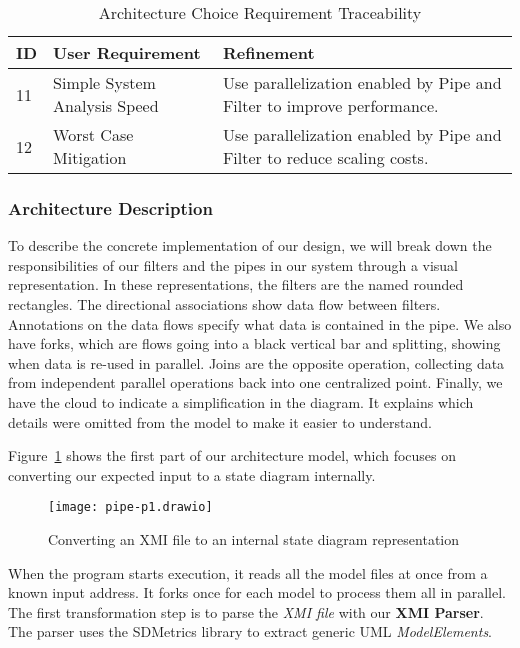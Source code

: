 \begin{table}[htbp]
    \centering
    \caption{Architecture Choice Requirement Traceability}\label{tab:arch-choice-table}
    \begin{tabularx}{\textwidth}{| l | l | X |}
        \hline
        \textbf{ID} & \textbf{User Requirement} & \textbf{Refinement} \\
        \hline
        11 & Simple System Analysis Speed & Use parallelization enabled by Pipe and Filter to improve performance. \\ \hline
        12 & Worst Case Mitigation & Use parallelization enabled by Pipe and Filter to reduce scaling costs.  \\ \hline
    \end{tabularx}
\end{table}

\newpage
\subsubsection{Architecture Description}\label{subsubsec:arch-desc}
To describe the concrete implementation of our design,
we will break down the responsibilities of our filters and the pipes in our system through a visual representation.
In these representations, the filters are the named rounded rectangles.
The directional associations show data flow between filters.
Annotations on the data flows specify what data is contained in the pipe.
We also have forks, which are flows going into a black vertical bar and splitting, showing when data is re-used in parallel.
Joins are the opposite operation, collecting data from independent parallel operations back into one centralized point.
Finally, we have the cloud to indicate a simplification in the diagram.
It explains which details were omitted from the model to make it easier to understand.

Figure~\ref{fig:pipe-1} shows the first part of our architecture model, which focuses on converting our expected input to a state diagram internally.
\begin{figure}[ht]
    \centering
    \texttt{[image: pipe-p1.drawio]}
    \caption{Converting an XMI file to an internal state diagram representation}
    \label{fig:pipe-1}
\end{figure}

When the program starts execution, it reads all the model files at once from a known input address.
It forks once for each model to process them all in parallel.
The first transformation step is to parse the \textit{XMI file} with our \textbf{XMI Parser}.
The parser uses the SDMetrics library to extract generic UML \textit{ModelElements}.

